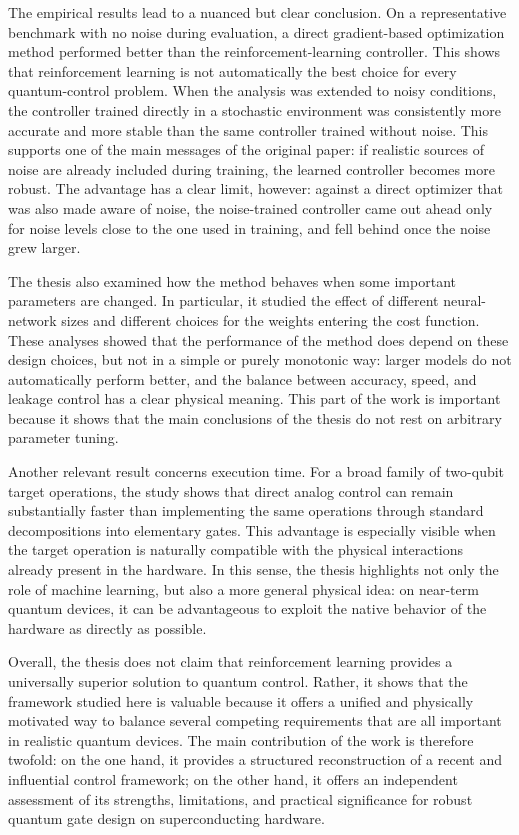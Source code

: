 \documentclass[11pt,a4paper]{article}
\begin{document}
The empirical results lead to a nuanced but clear conclusion. On a representative benchmark with no noise during evaluation, a direct gradient-based optimization method performed better than the reinforcement-learning controller. This shows that reinforcement learning is not automatically the best choice for every quantum-control problem. When the analysis was extended to noisy conditions, the controller trained directly in a stochastic environment was consistently more accurate and more stable than the same controller trained without noise. This supports one of the main messages of the original paper: if realistic sources of noise are already included during training, the learned controller becomes more robust. The advantage has a clear limit, however: against a direct optimizer that was also made aware of noise, the noise-trained controller came out ahead only for noise levels close to the one used in training, and fell behind once the noise grew larger.

The thesis also examined how the method behaves when some important parameters are changed. In particular, it studied the effect of different neural-network sizes and different choices for the weights entering the cost function. These analyses showed that the performance of the method does depend on these design choices, but not in a simple or purely monotonic way: larger models do not automatically perform better, and the balance between accuracy, speed, and leakage control has a clear physical meaning. This part of the work is important because it shows that the main conclusions of the thesis do not rest on arbitrary parameter tuning.

Another relevant result concerns execution time. For a broad family of two-qubit target operations, the study shows that direct analog control can remain substantially faster than implementing the same operations through standard decompositions into elementary gates. This advantage is especially visible when the target operation is naturally compatible with the physical interactions already present in the hardware. In this sense, the thesis highlights not only the role of machine learning, but also a more general physical idea: on near-term quantum devices, it can be advantageous to exploit the native behavior of the hardware as directly as possible.

Overall, the thesis does not claim that reinforcement learning provides a universally superior solution to quantum control. Rather, it shows that the framework studied here is valuable because it offers a unified and physically motivated way to balance several competing requirements that are all important in realistic quantum devices. The main contribution of the work is therefore twofold: on the one hand, it provides a structured reconstruction of a recent and influential control framework; on the other hand, it offers an independent assessment of its strengths, limitations, and practical significance for robust quantum gate design on superconducting hardware.
\end{document}
